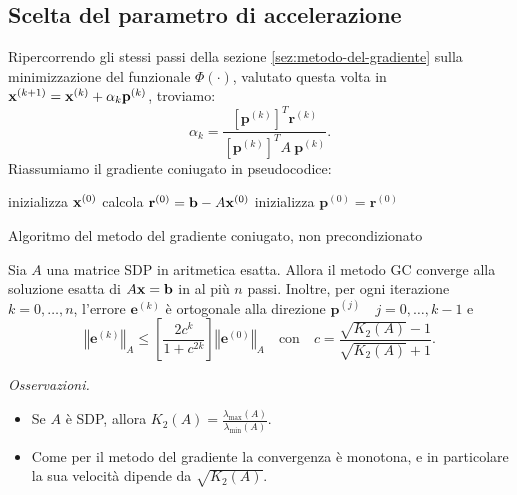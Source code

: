 \subsection{Scelta del parametro di accelerazione}
Ripercorrendo gli stessi passi della sezione \eqref{sez:metodo-del-gradiente} sulla minimizzazione del funzionale $\Phi ( \cdot )$, valutato questa volta in $\mathbf{x}^{( k+1)} =\mathbf{x}^{(k)} +\alpha _{k}\mathbf{p}^{(k)}$, troviamo:
\begin{equation*}
\alpha_{k} =\frac{\left[\mathbf{p}^{(k)}\right]^{T}\mathbf{r}^{(k)}}{\left[\mathbf{p}^{(k)}\right]^{T} A\ \mathbf{p}^{(k)}}.
\end{equation*}
Riassumiamo il gradiente coniugato in pseudocodice: \\
\begin{algo}
	inizializza $\mathbf{x}^{(0)}$\;
	calcola $\mathbf{r}^{(0)} =\mathbf{b} -A\mathbf{x}^{(0)}$\;
	inizializza $\mathbf{p}^{(0)} =\mathbf{r}^{(0)}$\;
	\caption{Algoritmo del metodo del gradiente coniugato, non precondizionato}
\end{algo}
\begin{theorem}
Sia $A$ una matrice SDP in aritmetica esatta.
Allora il metodo GC converge alla soluzione esatta di $A \mathbf{x} = \mathbf b$ in al più $n$ passi. Inoltre, per ogni iterazione $k=0,\dotsc ,n$, l'errore $\mathbf{e}^{(k)}$ è ortogonale alla direzione $\mathbf{p}^{(j)} \quad j=0,\dotsc ,k-1$ e
\begin{equation*}
\left\Vert \mathbf{e}^{(k)}\right\Vert _{A} \leqslant \left[\frac{2c^{k}}{1+c^{2k}}\right]\left\Vert \mathbf{e}^{(0)}\right\Vert _{A} \quad\text{con} \quad c=\frac{\sqrt{K_{2}(A)} -1}{\sqrt{K_{2}(A)} +1}.
\end{equation*}
\label{thm:convergenza-metodo-cg}
\end{theorem}
\textit{Osservazioni.}
\begin{itemize}
\item Se $A$ è SDP, allora $K_{2}(A) =\frac{\lambda _{\text{max}}(A)}{\lambda _{\text{min}}(A)}$.
\item Come per il metodo del gradiente la convergenza è monotona, e in particolare la sua velocità dipende da $\sqrt{K_{2}(A)}$.
\end{itemize}

